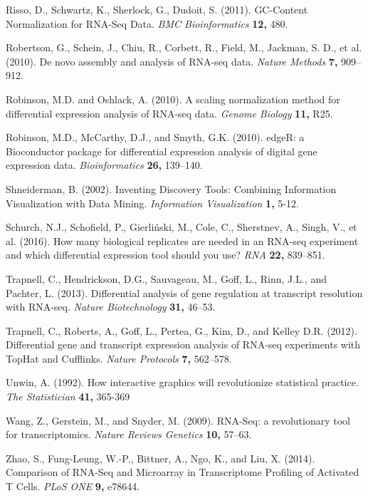 \documentclass[useAMS,referee]{biom}
\begin{document}
\begin{thebibliography}{}
\bibitem{ } Risso, D., Schwartz, K., Sherlock, G., Dudoit, S. (2011). GC-Content Normalization for RNA-Seq Data. \textit{BMC Bioinformatics} \textbf{12,} 480.

\bibitem{ } Robertson, G., Schein, J., Chiu, R., Corbett, R., Field, M., Jackman, S. D., et al. (2010). De novo assembly and analysis of RNA-seq data. \textit{Nature Methods} \textbf{7,} 909–912.

\bibitem{ } Robinson, M.D. and Oshlack, A. (2010). A scaling normalization method for differential expression analysis of RNA-seq data. \textit{Genome Biology} \textbf{11,} R25.

\bibitem{ } Robinson, M.D., McCarthy, D.J., and Smyth, G.K. (2010). edgeR: a Bioconductor package for differential expression analysis of digital gene expression data. \textit{Bioinformatics} \textbf{26,} 139–140.

\bibitem{ } Shneiderman, B. (2002). Inventing Discovery Tools: Combining Information Visualization with Data Mining. \textit{Information Visualization} \textbf{1,} 5-12.

\bibitem{ } Schurch, N.J., Schofield, P., Gierliński, M., Cole, C., Sherstnev, A., Singh, V., et al. (2016). How many biological replicates are needed in an RNA-seq experiment and which differential expression tool should you use? \textit{RNA} \textbf{22,} 839–851.

\bibitem{ } Trapnell, C., Hendrickson, D.G., Sauvageau, M., Goff, L., Rinn, J.L., and Pachter, L. (2013). Differential analysis of gene regulation at transcript resolution with RNA-seq.
\textit{Nature Biotechnology} \textbf{31,} 46–53.

\bibitem{ } Trapnell, C., Roberts, A., Goff, L., Pertea, G., Kim, D., and Kelley D.R. (2012). Differential gene and transcript expression analysis of RNA-seq experiments with TopHat and Cufflinks. \textit{Nature Protocols} \textbf{7,} 562–578.

\bibitem{ } Unwin, A. (1992). How interactive graphics will revolutionize statistical practice. \textit{The Statistician} \textbf{41,} 365-369

\bibitem{ } Wang, Z., Gerstein, M., and Snyder, M. (2009). RNA-Seq: a revolutionary tool for transcriptomics. \textit{Nature Reviews Genetics} \textbf{10,} 57–63.

\bibitem{ } Zhao, S., Fung-Leung, W.-P., Bittner, A., Ngo, K., and Liu, X. (2014). Comparison of RNA-Seq and Microarray in Transcriptome Profiling of Activated T Cells. \textit{PLoS ONE} \textbf{9,} e78644.








\end{thebibliography}
\end{document}
